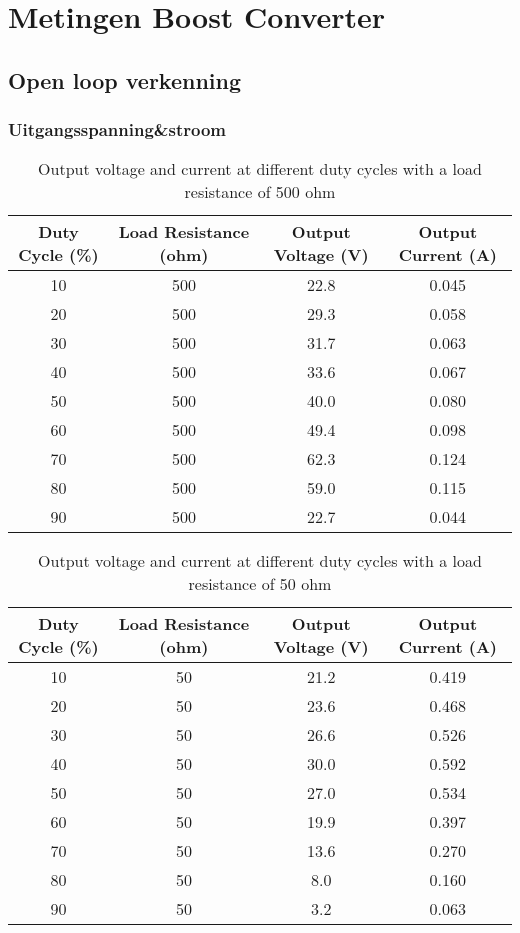 \section{Metingen Boost Converter}
\subsection{Open loop verkenning}
\subsubsection{Uitgangsspanning\&stroom}
\begin{table}[h!]
\centering
\begin{tabular}{|c|c|c|c|}
\hline
\textbf{Duty Cycle (\%)} & \textbf{Load Resistance (ohm)} & \textbf{Output Voltage (V)} & \textbf{Output Current (A)} \\ \hline
10 & 500 & 22.8 & 0.045 \\ \hline
20 & 500 & 29.3 & 0.058 \\ \hline
30 & 500 & 31.7 & 0.063 \\ \hline
40 & 500 & 33.6 & 0.067 \\ \hline
50 & 500 & 40.0 & 0.080 \\ \hline
60 & 500 & 49.4 & 0.098 \\ \hline
70 & 500 & 62.3 & 0.124 \\ \hline
80 & 500 & 59.0 & 0.115 \\ \hline
90 & 500 & 22.7 & 0.044 \\ \hline
\end{tabular}
\caption{Output voltage and current at different duty cycles with a load resistance of 500 ohm}
\label{tab:duty_cycle_output}
\end{table}

\begin{table}[h!]
\centering
\begin{tabular}{|c|c|c|c|}
\hline
\textbf{Duty Cycle (\%)} & \textbf{Load Resistance (ohm)} & \textbf{Output Voltage (V)} & \textbf{Output Current (A)} \\ \hline
10 & 50 & 21.2 & 0.419 \\ \hline
20 & 50 & 23.6 & 0.468 \\ \hline
30 & 50 & 26.6 & 0.526 \\ \hline
40 & 50 & 30.0 & 0.592 \\ \hline
50 & 50 & 27.0 & 0.534 \\ \hline
60 & 50 & 19.9 & 0.397 \\ \hline
70 & 50 & 13.6 & 0.270 \\ \hline
80 & 50 & 8.0 & 0.160 \\ \hline
90 & 50 & 3.2 & 0.063 \\ \hline
\end{tabular}
\caption{Output voltage and current at different duty cycles with a load resistance of 50 ohm}
\label{tab:duty_cycle_output_50ohm}
\end{table}
